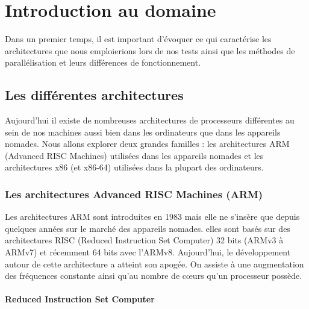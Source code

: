 \chapter{Introduction au domaine}

Dans un premier temps, il est important d'évoquer ce qui caractérise les architectures que nous emploierions lors de nos tests ainsi que les méthodes de parallélisation et leurs différences de fonctionnement.

\section{ Les différentes architectures }

Aujourd'hui il existe de nombreuses architectures de processeurs différentes au sein de nos machines aussi bien dans les ordinateurs que dans les appareils nomades. Nous allons explorer deux grandes familles :
les architectures ARM (Advanced RISC Machines) utilisées dans les appareils nomades et les architectures x86 (et x86-64) utilisées dans la plupart des ordinateurs.

\subsection{ Les architectures Advanced RISC Machines (ARM)}

Les architectures ARM sont introduites en 1983 mais elle ne s'insère que depuis quelques années sur le marché des appareils nomades. elles sont basés sur des architectures RISC (Reduced Instruction Set Computer) 32 bits (ARMv3 à ARMv7) et récemment 64 bits avec l'ARMv8. Aujourd'hui, le développement autour de cette architecture a atteint son apogée. On assiste à une augmentation des fréquences constante ainsi qu'au nombre de cœurs qu'un processeur possède.

\subsubsection{ Reduced Instruction Set Computer }

